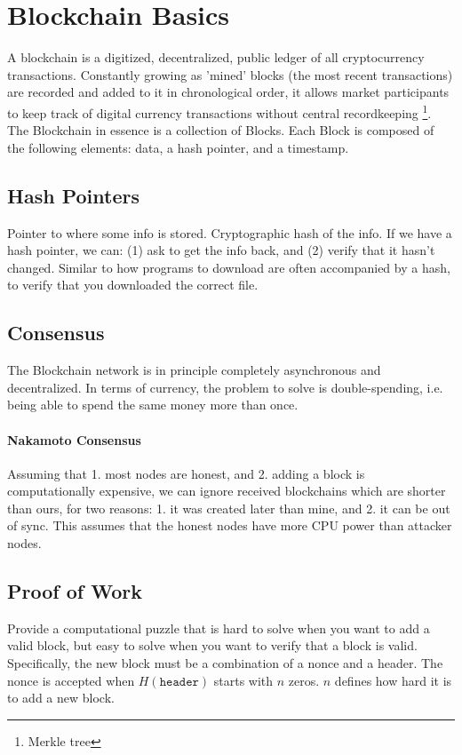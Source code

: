 \documentclass[twocolumn]{article}
\begin{document}
\section{Blockchain Basics}
A blockchain is a digitized, decentralized, public ledger of all cryptocurrency transactions. Constantly growing as 'mined' blocks (the most recent transactions) are recorded and added to it in chronological order, it allows market participants to keep track of digital currency transactions without central recordkeeping \footnote{Merkle tree}.
The Blockchain in essence is a collection of Blocks.
Each Block is composed of the following elements: data, a hash pointer, and a timestamp.
\subsection{Hash Pointers}
Pointer to where some info is stored.
Cryptographic hash of the info.
If we have a hash pointer, we can: (1) ask to get the info back, and (2) verify that it hasn't changed.
Similar to how programs to download are often accompanied by a hash, to verify that you downloaded the correct file.
\subsection{Consensus}
The Blockchain network is in principle completely asynchronous and decentralized.
In terms of currency, the problem to solve is double-spending, i.e. being able to spend the same money more than once.

\paragraph{Nakamoto Consensus} Assuming that 1. most nodes are honest, and 2. adding a block is computationally expensive, we can ignore received blockchains which are shorter than ours, for two reasons: 1. it was created later than mine, and 2. it can be out of sync.
This assumes that the honest nodes have more CPU power than attacker nodes.


\subsection{Proof of Work}
Provide a computational puzzle that is hard to solve when you want to add a valid block, but easy to solve when you want to verify that a block is valid.
Specifically, the new block must be a combination of a nonce and a header.
The nonce is accepted when $H(\mathtt{header})$ starts with $n$ zeros.
$n$ defines how hard it is to add a new block.
\end{document}
